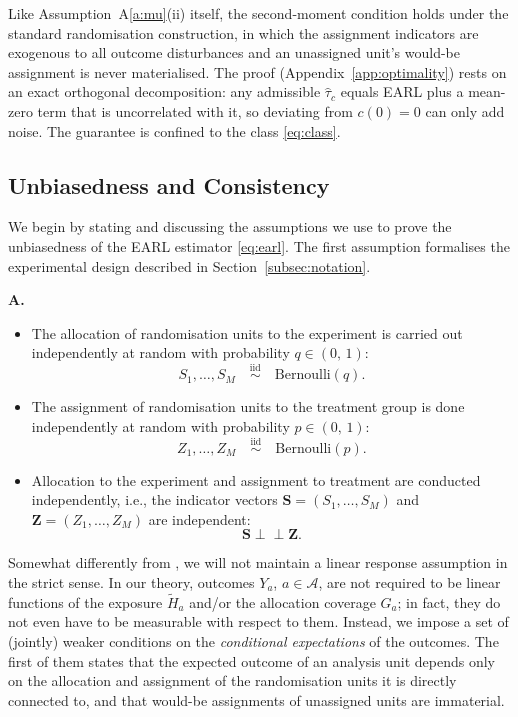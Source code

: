 \documentclass[sigconf]{acmart}
\newcounter{assumption}
\newenvironment{assumption}{\refstepcounter{assumption}\par\medskip\noindent\textbf{A\theassumption.}\enspace}{\par\medskip}
\newcommand{\iidsim}{{\stackrel{\mathrm{iid}}{\sim}}}
\newcommand{\ind}{\perp\!\!\!\perp}
\begin{document}
Like Assumption~A\ref{a:mu}(ii) itself, the second-moment condition holds under the standard randomisation construction, in which the assignment indicators are exogenous to all outcome disturbances and an unassigned unit's would-be assignment is never materialised. The proof (Appendix~\ref{app:optimality}) rests on an exact orthogonal decomposition: any admissible $\hat\tau_c$ equals EARL plus a mean-zero term that is uncorrelated with it, so deviating from $c(0)=0$ can only add noise. The guarantee is confined to the class \eqref{eq:class}.

\subsection{Unbiasedness and Consistency}\label{subsec:analysis}

We begin by stating and discussing the assumptions we use to prove the unbiasedness of the EARL estimator \eqref{eq:earl}. The first assumption formalises the experimental design described in Section~\ref{subsec:notation}.

\begin{assumption}\label{a:1}
\begin{itemize}
\item The allocation of randomisation units to the experiment is carried out independently at random with probability $q\in(0,\,1)$:
\[
    S_1,\ldots,S_M \quad \iidsim \quad \mathrm{Bernoulli}(q).
\]
\item
The assignment of randomisation units to the treatment group is done independently at random with probability $p\in(0,\,1)$:
\[
    Z_1,\ldots,Z_M \quad \iidsim \quad \mathrm{Bernoulli}(p).
\]
\item
Allocation to the experiment and assignment to treatment are conducted independently, i.e., the indicator vectors
$\mathbf S=(S_1,\ldots,S_M)$ and $\mathbf Z=(Z_1,\allowbreak\ldots,\allowbreak Z_M)$ are independent:
\[
    \mathbf S \ind \mathbf Z.
\]
\end{itemize}
\end{assumption}

Somewhat differently from \cite{harshaw2023erl}, we will not maintain a linear response assumption in the strict sense. In our theory, outcomes $Y_a$, $a\in\mathcal A$, are not required to be linear functions of the exposure $\tilde H_a$ and/or the allocation coverage $G_a$; in fact, they do not even have to be measurable with respect to them. Instead, we impose a set of (jointly) weaker conditions on the \emph{conditional expectations} of the outcomes. The first of them states that the expected outcome of an analysis unit depends only on the allocation and assignment of the randomisation units it is directly connected to, and that would-be assignments of unassigned units are immaterial.
\end{document}
